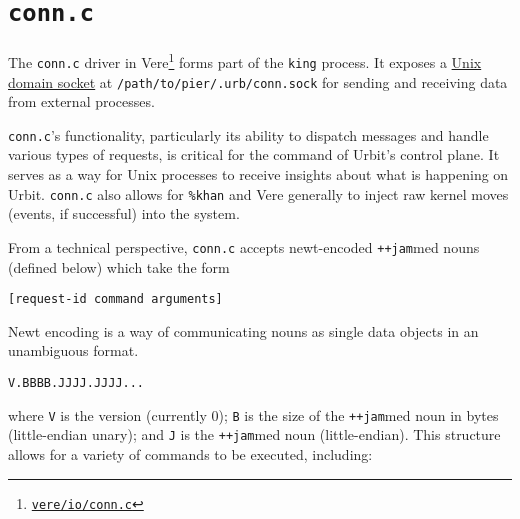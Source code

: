\documentclass[twoside]{article}
\begin{document}
\section{\texttt{conn.c}} 

The \texttt{conn.c} driver in Vere\footnote{\href{https://github.com/urbit/vere/blob/develop/pkg/vere/io/conn.c}{\texttt{vere/io/conn.c}}} forms part of the \texttt{king} process.  It exposes a \href{https://en.wikipedia.org/wiki/Unix_domain_socket}{Unix domain socket} at \texttt{/path/to/pier/.urb/conn.sock} for sending and receiving data from external processes.

\texttt{conn.c}'s functionality, particularly its ability to dispatch messages and handle various types of requests, is critical for the command of Urbit's control plane.  It serves as a way for Unix processes to receive insights about what is happening on Urbit.  \texttt{conn.c} also allows for \texttt{\%khan} and Vere generally to inject raw kernel moves (events, if successful) into the system.

From a technical perspective, \texttt{conn.c} accepts newt-encoded \lstinline[style=inlinecode]{++jam}med nouns (defined below) which take the form
\begin{lstlisting}[style=listingblock]
[request-id command arguments]
\end{lstlisting}
\noindent
Newt encoding is a way of communicating nouns as single data objects in an unambiguous format.

\begin{lstlisting}[style=listingblock]
V.BBBB.JJJJ.JJJJ...
\end{lstlisting}
\noindent
where \texttt{V} is the version (currently 0); \texttt{B} is the size of the \lstinline[style=inlinecode]{++jam}med noun in bytes (little-endian unary); and \texttt{J} is the \lstinline[style=inlinecode]{++jam}med noun (little-endian).  This structure allows for a variety of commands to be executed, including:
\end{document}
